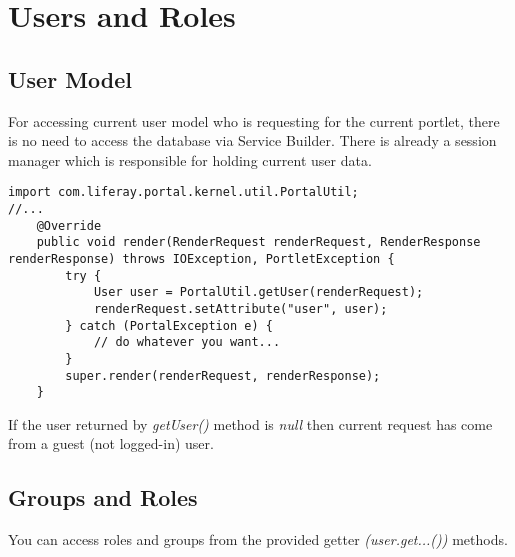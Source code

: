 \section{Users and Roles}
\subsection{User Model}

For accessing current user model who is requesting for the current portlet, there is no need to access the database via Service Builder. There is already a session manager which is responsible for holding current user data.

\lstset{language=java}
\begin{minipage}{\linewidth}
\begin{lstlisting}[caption=AwesomePortlet.java]
import com.liferay.portal.kernel.util.PortalUtil;
//...
    @Override
    public void render(RenderRequest renderRequest, RenderResponse renderResponse) throws IOException, PortletException {
        try {
            User user = PortalUtil.getUser(renderRequest);
            renderRequest.setAttribute("user", user);
        } catch (PortalException e) {
            // do whatever you want...
        }
        super.render(renderRequest, renderResponse);
    }
\end{lstlisting}
\end{minipage}

If the user returned by \textit{getUser()} method is \textit{null} then current request has come from a guest (not logged-in) user.

\subsection{Groups and Roles}
You can access roles and groups from the provided getter \textit{(user.get...())} methods.